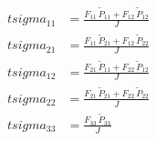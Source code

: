 \begin{align}
tsigma_{11} &= \frac{F_{11}\,\tilde{P}_{11}+F_{12}\,\tilde{P}_{12}}{J} \\ 
tsigma_{21} &= \frac{F_{11}\,\tilde{P}_{21}+F_{12}\,\tilde{P}_{22}}{J} \\ 
tsigma_{12} &= \frac{F_{21}\,\tilde{P}_{11}+F_{22}\,\tilde{P}_{12}}{J} \\ 
tsigma_{22} &= \frac{F_{21}\,\tilde{P}_{21}+F_{22}\,\tilde{P}_{22}}{J} \\ 
tsigma_{33} &= \frac{F_{33}\,\tilde{P}_{33}}{J} 
\end{align}
